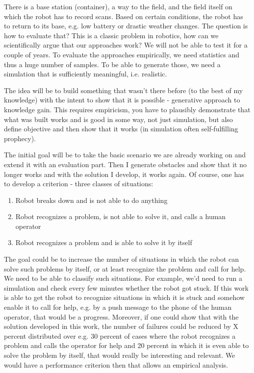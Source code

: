 \documentclass[german, master, expose, latin1]{base/thesis_KBS}
\begin{document}
There is a base station (container), a way to the field, and the field itself on which the robot has to record scans. Based on certain conditions, the robot has to return
to its base, e.g. low battery or drastic weather changes. The question is how to evaluate that?
This is a classic problem in robotics, how can we scientifically argue that our approaches work? We will not be able to test it for a couple of years.
To evaluate the approaches empirically, we need statistics and thus a huge number of samples. To be able to generate those, we need a simulation
that is sufficiently meaningful, i.e. realistic.\newline

The idea will be to build something that wasn't there before (to the best of my knowledge) with the intent to show that it is possible - generative approach to knowledge gain.
This requires empiricism, you have to plausibly demonstrate that what was built works and is good in some way, not just simulation, but also define objective and then 
show that it works (in simulation often self-fulfilling prophecy).\newline

The initial goal will be to take the basic scenario we are already working on and extend it with an evaluation part. Then I generate obstacles and show that it no
longer works and with the solution I develop, it works again. Of course, one has to develop a criterion - three classes of situations:
\begin{enumerate}
    \item Robot breaks down and is not able to do anything
    \item Robot recognizes a problem, is not able to solve it, and calls a human operator
    \item Robot recognizes a problem and is able to solve it by itself
\end{enumerate}

The goal could be to increase the number of situations in which the robot can solve such problems by itself, or at least recognize the problem and call for help.
We need to be able to classify such situations. For example, we'd need to run a simulation and check every few minutes whether the robot got stuck.
If this work is able to get the robot to recognize situations in which it is stuck and somehow enable it to call for help, e.g. by a push message to
the phone of the human operator, that would be a progress. Moreover, if one could show that with the solution developed in this work, the number of failures
could be reduced by X percent distributed over e.g. 30 percent of cases where the robot recognizes a problem and calls the operator for help and 20 percent in which
it is even able to solve the problem by itself, that would really be interesting and relevant. We would have a performance criterion then that allows 
an empirical analysis.\newline
\end{document}
